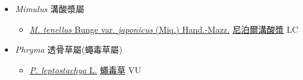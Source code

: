 
  \begin{itemize}
 \item[] \textit{Mimulus} 溝酸漿屬
                    
  \begin{itemize}
        \item[] \href{http://www.theplantlist.org/tpl1.1/search?q=Mimulus+tenellus+var.+japonicus}{\textit{M. tenellus} Bunge var. \textit{japonicus} (Miq.) Hand.-Mazz.}   \href{\detokenize{http://taibnet.sinica.edu.tw/chi/taibnet_species_list.php?T2=尼泊爾溝酸漿&T2_new_value=true&fr=y}}{尼泊爾溝酸漿} LC
  \end{itemize}
 \item[] \textit{Phryma} 透骨草屬(蠅毒草屬)
                    
  \begin{itemize}
        \item[] \href{http://www.theplantlist.org/tpl1.1/search?q=Phryma+leptostachya}{\textit{P. leptostachya} L.}   \href{\detokenize{http://taibnet.sinica.edu.tw/chi/taibnet_species_list.php?T2=蠅毒草&T2_new_value=true&fr=y}}{蠅毒草} VU
  \end{itemize}
  \end{itemize}
